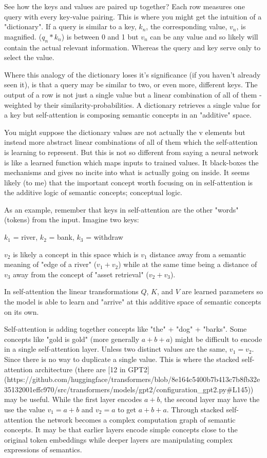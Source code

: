 See how the keys and values are paired up together? Each row measures one query with every key-value pairing. This is where you might get the intuition of a "dictionary". If a query is similar to a key, $k_n$, the corresponding value, $v_n$, is magnified. ($q_n * k_n$) is between 0 and 1 but $v_n$ can be any value and so likely will contain the actual relevant information. Whereas the query and key serve only to select the value.

Where this analogy of the dictionary loses it's significance (if you haven't already seen it), is that a query may be similar to two, or even more, different keys. The output of a row is not just a single value but a linear combination of all of them - weighted by their similarity-probabilities. A dictionary retrieves a single value for a key but self-attention is composing semantic concepts in an "additive" space.

You might suppose the dictionary values are not actually the v elements but instead more abstract linear combinations of all of them which the self-attention is learning to represent. But this is not so different from saying a neural network is like a learned function which maps inputs to trained values. It black-boxes the mechanisms and gives no incite into what is actually going on inside. It seems likely (to me) that the important concept worth focusing on in self-attention is the additive logic of semantic concepts; conceptual logic.

As an example, remember that keys in self-attention are the other "words" (tokens) from the input. Imagine two keys:

$k_1$ = river, $k_2$ = bank, $k_3$ = withdraw

$v_2$ is likely a concept in this space which is $v_1$ distance away from a semantic meaning of "edge of a river" ($v_1 + v_2$) while at the same time being a distance of $v_3$ away from the concept of "asset retrieval" ($v_2 + v_3$).

In self-attention the linear transformations $Q$, $K$, and $V$ are learned parameters so the model is able to learn and "arrive" at this additive space of semantic concepts on its own.

Self-attention is adding together concepts like "the" + "dog" + "barks". Some concepts like "gold is gold" (more generally $a+b+a$) might be difficult to encode in a single self-attention layer. Unless two distinct values are the same, $v_1=v_2$. Since there is no way to duplicate a single value. This is where the stacked self-attention architecture (there are [12 in GPT2](https://github.com/huggingface/transformers/blob/8e164c5400b7b413c7b8fb32e35132001effc970/src/transformers/models/gpt2/configuration_gpt2.py#L145)) may be useful. While the first layer encodes $a+b$, the second layer may have the use the value $v_1=a+b$ and $v_2=a$ to get $a+b+a$. Through stacked self-attention the network becomes a complex computation graph of semantic concepts. It may be that earlier layers encode simple concepts close to the original token embeddings while deeper layers are manipulating complex expressions of semantics.

